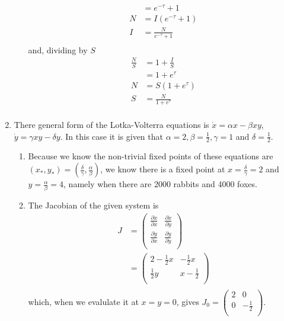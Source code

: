 \documentclass[10pt]{article}
\newcommand*{\px}[2]{\tfrac{\partial\dot #1}{\partial #2}}
\begin{document}
\begin{enumerate}
\begin{enumerate}
\begin{align*}
              &= e^{-\tau} + 1 \\
              N &= I(e^{-\tau} + 1) \\
              I &= \frac{N}{e^{-\tau} + 1} \\
            \end{align*}
            and, dividing by $S$
            \begin{align*}
              \frac{N}{S} &=  1 + \frac{I}{S}\\
              &= 1 + e^\tau \\
              N &= S(1 + e^\tau) \\
              S &= \frac{N}{1 + e^{\tau}} \\
            \end{align*}
        \end{enumerate}
      \item There general form of the Lotka-Volterra equations is $\dot x =
        \alpha x - \beta x y$, $\dot y = \gamma xy - \delta y$. In this case it
        is given that $\alpha = 2, \beta = \tfrac{1}{2}, \gamma = 1$ and
        $\delta = \tfrac{1}{2}$.
        \begin{enumerate}
          \item Because we know the non-trivial fixed points of these equations
            are $(x_*, y_*) = \left(\frac{\delta}{\gamma},
            \frac{\alpha}{\beta}\right)$, we know there is a fixed point at $x
            = \frac{\delta}{\gamma} = 2$ and $y = \frac{\alpha}{\beta} = 4$,
            namely when there are 2000 rabbits and 4000 foxes.
          \item The Jacobian of the given system is
            \begin{align*}
              J &=
                \begin{pmatrix}
                  \px{x}{x} & \px{x}{y} \\ 
                  \px{y}{x} & \px{y}{y} \\ 
                \end{pmatrix} \\
                &=
                \begin{pmatrix}
                  2 - \tfrac{1}{2} x & -\tfrac{1}{2}x \\ 
                  \tfrac{1}{2} y & x - \tfrac{1}{2} \\ 
                \end{pmatrix} \\
            \end{align*}
            which, when we evalulate it at $x = y = 0$, gives $
              J_0 =
                \begin{pmatrix}
                  2 & 0 \\ 
                  0 & -\tfrac{1}{2} \\ 
                \end{pmatrix} 
              $.


\end{enumerate}
\end{enumerate}
\end{document}
